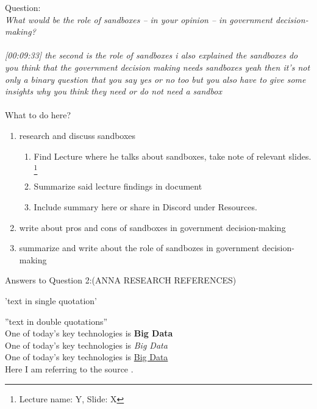 Question:\\
\emph{
    What would be the role of sandboxes – in your opinion – in government decision-making?
}\\\\
\emph{[00:09:33] the second is the role of sandboxes i also explained the sandboxes do you think that the government decision making needs sandboxes
yeah then it's not only a binary question that you say yes or no too but you also have to give some insights
why you think they need or do not need a sandbox}\\\\
What to do here?
\begin{enumerate}
    \item research and discuss sandboxes
    \begin{enumerate}
    \item Find Lecture where he talks about sandboxes, take note of relevant slides.
    \footnote{Lecture name: Y, Slide: X}
    \item Summarize said lecture findings in document
    \item Include summary here or share in Discord under Resources.
    \end{enumerate}
    \item write about pros and cons of sandboxes in government decision-making
    \item summarize and write about the role of sandbozes in government decision-making
  \end{enumerate}

\newpage Answers to Question 2:(ANNA RESEARCH REFERENCES)

\newpage 
'text in single quotation'

''text in double quotations''\\

One of today’s key technologies is \textbf{Big Data}\\
One of today’s key technologies is \textit{Big Data}\\
One of today’s key technologies is \underline{Big Data}\\

Here I am referring to the source \cite{BigData}.